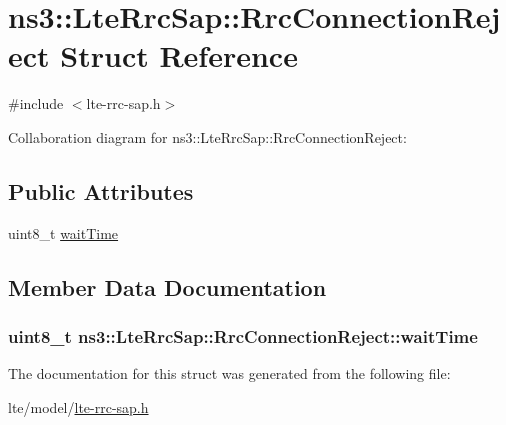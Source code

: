\hypertarget{structns3_1_1LteRrcSap_1_1RrcConnectionReject}{}\section{ns3\+:\+:Lte\+Rrc\+Sap\+:\+:Rrc\+Connection\+Reject Struct Reference}
\label{structns3_1_1LteRrcSap_1_1RrcConnectionReject}


{\ttfamily \#include $<$lte-\/rrc-\/sap.\+h$>$}



Collaboration diagram for ns3\+:\+:Lte\+Rrc\+Sap\+:\+:Rrc\+Connection\+Reject\+:
\subsection*{Public Attributes}
\begin{DoxyCompactItemize}
\item 
uint8\+\_\+t \hyperlink{structns3_1_1LteRrcSap_1_1RrcConnectionReject_a2a7999c9f68b395cf5dc44a35270a2b5}{wait\+Time}
\end{DoxyCompactItemize}


\subsection{Member Data Documentation}
\subsubsection[{\texorpdfstring{wait\+Time}{waitTime}}]{\setlength{\rightskip}{0pt plus 5cm}uint8\+\_\+t ns3\+::\+Lte\+Rrc\+Sap\+::\+Rrc\+Connection\+Reject\+::wait\+Time}\hypertarget{structns3_1_1LteRrcSap_1_1RrcConnectionReject_a2a7999c9f68b395cf5dc44a35270a2b5}{}\label{structns3_1_1LteRrcSap_1_1RrcConnectionReject_a2a7999c9f68b395cf5dc44a35270a2b5}


The documentation for this struct was generated from the following file\+:\begin{DoxyCompactItemize}
\item 
lte/model/\hyperlink{lte-rrc-sap_8h}{lte-\/rrc-\/sap.\+h}\end{DoxyCompactItemize}
